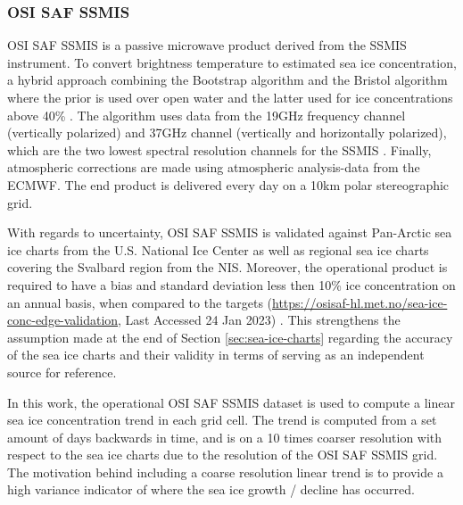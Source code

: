 \documentclass[../main/thesis.tex]{subfiles}
\begin{document}
\subsubsection{OSI SAF SSMIS}
\label{sec:osisafssmis}
OSI SAF SSMIS is a passive microwave product derived from the SSMIS instrument. To convert brightness temperature to estimated sea ice concentration, a hybrid approach combining the Bootstrap algorithm \citep{Comiso1997} and the Bristol algorithm \citep{Smith1996} where the prior is used over open water and the latter used for ice concentrations above 40\% \citep{Tonboe2017}. The algorithm uses data from the 19GHz frequency channel (vertically polarized) and 37GHz channel (vertically and horizontally polarized), which are the two lowest spectral resolution channels for the SSMIS \cite{Tonboe2017}. Finally, atmospheric corrections are made using atmospheric analysis-data from the ECMWF. The end product is delivered every day on a 10km polar stereographic grid.

With regards to uncertainty, OSI SAF SSMIS is validated against Pan-Arctic sea ice charts from the U.S. National Ice Center as well as regional sea ice charts covering the Svalbard region from the NIS. Moreover, the operational product is required to have a bias and standard deviation less then 10\% ice concentration on an annual basis, when compared to the targets (\url{https://osisaf-hl.met.no/sea-ice-conc-edge-validation}, Last Accessed 24 Jan 2023) \citep{Lavelle2017}. This strengthens the assumption made at the end of Section \ref{sec:sea-ice-charts} regarding the accuracy of the sea ice charts and their validity in terms of serving as an independent source for reference.

In this work, the operational OSI SAF SSMIS dataset is used to compute a linear sea ice concentration trend in each grid cell. The trend is computed from a set amount of days backwards in time, and is on a 10 times coarser resolution with respect to the sea ice charts due to the resolution of the OSI SAF SSMIS grid. The motivation behind including a coarse resolution linear trend is to provide a high variance indicator of where the sea ice growth / decline has occurred.
\end{document}
